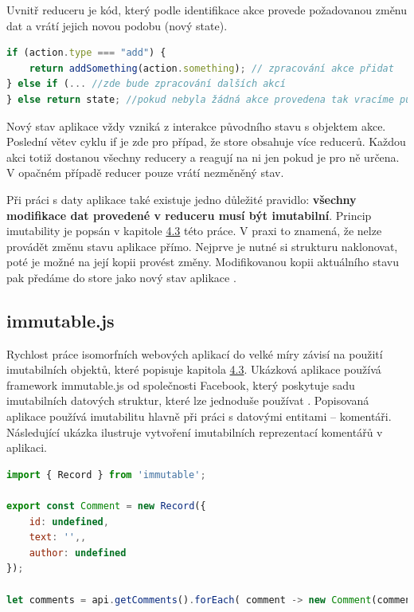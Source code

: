 Uvnitř reduceru je kód, který podle identifikace akce provede požadovanou změnu dat a vrátí jejich novou podobu (nový state).

\pagebreak
\begin{lstlisting}[language=Javascript,caption={Ukázka implementace Redux reduceru}]
if (action.type === "add") { 
    return addSomething(action.something); // zpracování akce přidat 
} else if (... //zde bude zpracování dalších akcí
} else return state; //pokud nebyla žádná akce provedena tak vracíme původní nezměněná data
\end{lstlisting}

Nový stav aplikace vždy vzniká z interakce původního stavu s objektem akce. Poslední větev cyklu if je zde pro případ, že store obsahuje více reducerů. Každou akci totiž dostanou všechny reducery a reagují na ni jen pokud je pro ně určena. V opačném případě reducer pouze vrátí nezměněný stav.

Při práci s daty aplikace také existuje jedno důležité pravidlo: \textbf{všechny modifikace dat provedené v reduceru musí být imutabilní}. Princip imutability je popsán v kapitole \hyperref[sec:immutability]{4.3} této práce. V praxi to znamená, že nelze provádět změnu stavu aplikace přímo. Nejprve je nutné si strukturu naklonovat, poté je možné na její kopii provést změny. Modifikovanou kopii aktuálního stavu pak předáme do store jako nový stav aplikace \cite{redux}.

\subsection{immutable.js}
Rychlost práce isomorfních webových aplikací do velké míry závisí na použití imutabilních objektů, které popisuje kapitola \hyperref[sec:immutability]{4.3}. Ukázková aplikace používá framework immutable.js od společnosti Facebook, který poskytuje sadu imutabilních datových struktur, které lze jednoduše používat \cite{immutablejs}. Popisovaná aplikace používá imutabilitu hlavně při práci s datovými entitami – komentáři. Následující ukázka ilustruje vytvoření imutabilních reprezentací komentářů v aplikaci.
\begin{lstlisting}[language=Javascript,caption={Ukázka vytváření imutabilních datových objektů v ukázkové aplikaci}]
import { Record } from 'immutable';

export const Comment = new Record({
    id: undefined,
    text: '',,
    author: undefined
});

let comments = api.getComments().forEach( comment -> new Comment(comment)); // pomocí new vytvoříme imutabilní reprezentace komentářů
\end{lstlisting}
